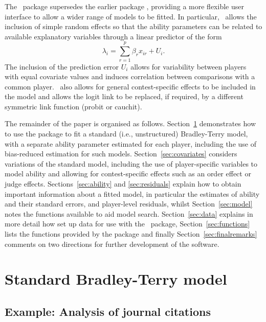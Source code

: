 The \BT\ package supersedes the earlier  package
\citep{firt:05}, providing a more flexible user interface to allow a wider
range of models to be fitted. In particular, \BT\ allows the inclusion of
simple random effects so that the ability parameters can be related to available
explanatory variables through a linear predictor of the form
\begin{equation}
    \lambda_i=\sum_{r=1}^p\beta_rx_{ir} + U_i.
\end{equation}
The inclusion of the prediction
error $U_i$ allows for variability between players with equal covariate values
and induces correlation between comparisons with a common player. \BT\ also
allows for general contest-specific effects to be included in the model and
allows the logit link to be replaced, if required, by a different symmetric link
function (probit or cauchit).

The remainder of the paper is organised as follows. Section~\ref{sec:BTmodel}
demonstrates how to use the  package to fit a standard
(i.e., unstructured) Bradley-Terry model, with a separate ability parameter estimated for each
player, including the use of bias-reduced estimation for such
models.  Section~\ref{sec:covariates} considers variations of the standard
model, including the use of player-specific variables to model ability and
allowing for contest-specific effects such as an order effect or judge
effects. Sections~\ref{sec:ability} and \ref{sec:residuals} explain how to
obtain important information about a fitted model, in particular the
estimates of ability and their standard errors, and player-level
residuals, whilst
Section~\ref{sec:model} notes the functions available to aid model
search. Section~\ref{sec:data} explains in more detail how set up data for use
with the \BT\ package, Section~\ref{sec:functions} lists the functions
provided by the package and finally Section~\ref{sec:finalremarks}
comments on two directions for further development of the software.

\section{Standard Bradley-Terry model}
\label{sec:BTmodel}

\subsection{Example: Analysis of journal citations}
\label{citations}

